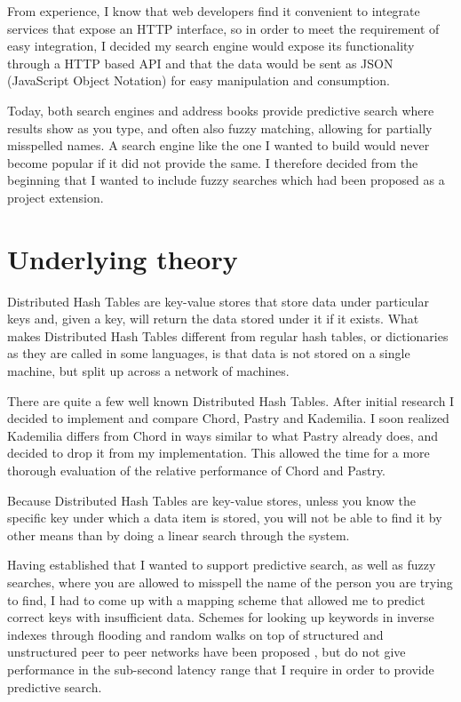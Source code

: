 From experience, I know that web developers find it convenient to integrate services that expose an HTTP interface, so in order to meet the requirement of easy integration, I decided my search engine would expose its functionality through a HTTP based API and that the data would be sent as JSON (JavaScript Object Notation) for easy manipulation and consumption.

Today, both search engines and address books provide predictive search where results show as you type, and often also fuzzy matching, allowing for partially misspelled names. A search engine like the one I wanted to build would never become popular if it did not provide the same. I therefore decided from the beginning that I wanted to include fuzzy searches which had been proposed as a project extension.

\section{Underlying theory}
Distributed Hash Tables are key-value stores that store data under particular keys and, given a key, will return the data stored under it if it exists.
What makes Distributed Hash Tables different from regular hash tables, or dictionaries as they are called in some languages, is that data is not stored on a single machine, but split up across a network of machines.

There are quite a few well known Distributed Hash Tables. After initial research I decided to implement and compare Chord, Pastry and Kademilia. I soon realized Kademilia differs from Chord in ways similar to what Pastry already does, and decided to drop it from my implementation. This allowed the time for a more thorough evaluation of the relative performance of Chord and Pastry.

Because Distributed Hash Tables are key-value stores, unless you know the specific key under which a data item is stored, you will not be able to find it by other means than by doing a linear search through the system.

Having established that I wanted to support predictive search, as well as fuzzy searches, where you are allowed to misspell the name of the person you are trying to find, I had to come up with a mapping scheme that allowed me to predict correct keys with insufficient data. 
Schemes for looking up keywords in inverse indexes through flooding and random walks on top of structured and unstructured peer to peer networks have been proposed \cite{myths}, but do not give performance in the sub-second latency range that I require in order to provide predictive search.

